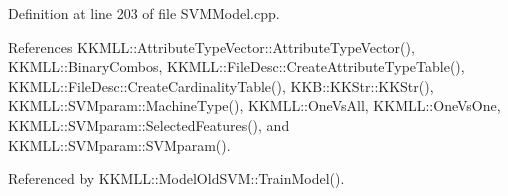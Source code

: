 Definition at line 203 of file S\+V\+M\+Model.\+cpp.



References K\+K\+M\+L\+L\+::\+Attribute\+Type\+Vector\+::\+Attribute\+Type\+Vector(), K\+K\+M\+L\+L\+::\+Binary\+Combos, K\+K\+M\+L\+L\+::\+File\+Desc\+::\+Create\+Attribute\+Type\+Table(), K\+K\+M\+L\+L\+::\+File\+Desc\+::\+Create\+Cardinality\+Table(), K\+K\+B\+::\+K\+K\+Str\+::\+K\+K\+Str(), K\+K\+M\+L\+L\+::\+S\+V\+Mparam\+::\+Machine\+Type(), K\+K\+M\+L\+L\+::\+One\+Vs\+All, K\+K\+M\+L\+L\+::\+One\+Vs\+One, K\+K\+M\+L\+L\+::\+S\+V\+Mparam\+::\+Selected\+Features(), and K\+K\+M\+L\+L\+::\+S\+V\+Mparam\+::\+S\+V\+Mparam().



Referenced by K\+K\+M\+L\+L\+::\+Model\+Old\+S\+V\+M\+::\+Train\+Model().


